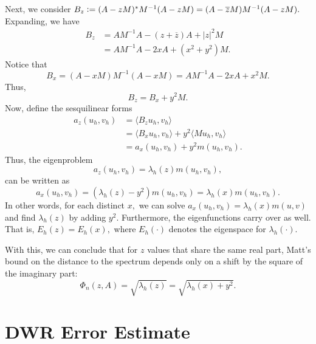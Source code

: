 \documentclass[12pt,a4paper]{article}
\newcommand{\defeq}{\vcentcolon=}
\theoremstyle{boldthm}
\theoremstyle{bolddefn}
\begin{document}
Next, we consider $B_z \defeq (A-zM)^*M^{-1}(A-zM) = (A-\overline{z}M)M^{-1}(A-zM).$ Expanding, we have 
\begin{align}
    B_z &= AM^{-1}A - (z + \overline z) A + |z|^2 M \\
    &= AM^{-1} A - 2xA + (x^2 + y^2) M.
\end{align}
Notice that 
\begin{equation}
    B_x = (A-xM)M^{-1}(A-xM) = AM^{-1}A - 2xA + x^2 M.
\end{equation}
Thus, 
\begin{equation}
    B_z = B_x + y^2 M.
\end{equation}
Now, define the sesquilinear forms 
\begin{align}
    a_z(u_h, v_h) &= \langle B_z u_h, v_h \rangle \\
    &= \langle B_x u_h, v_h \rangle + y^2 \langle M u_h, v_h \rangle  \\
    &= a_x(u_h, v_h) + y^2 m(u_h, v_h).
\end{align}
Thus, the eigenproblem 
\begin{equation}
    a_z(u_h, v_h) = \lambda_h(z) m(u_h, v_h),
\end{equation}
can be written as 
\begin{equation}
    a_x(u_h, v_h) = (\lambda_h(z) - y^2) m(u_h, v_h) = \lambda_h(x) m(u_h, v_h).
\end{equation}
In other words, for each distinct $x,$ we can solve $a_x(u_h, v_h) = \lambda_h(x) m(u, v)$ and find $\lambda_h(z)$ by adding $y^2.$ Furthermore, the eigenfunctions carry over as well. That is, $E_h(z) = E_h(x),$ where $E_h(\cdot)$ denotes the eigenspace for $\lambda_h(\cdot).$

With this, we can conclude that for $z$ values that share the same real part, Matt's bound on the distance to the spectrum depends only on a shift by the square of the imaginary part:
\begin{equation}
    \Phi_n(z, A) = \sqrt{\lambda_h(z)} = \sqrt{\lambda_h(x) + y^2}.
\end{equation}


\section{DWR Error Estimate}
\end{document}
